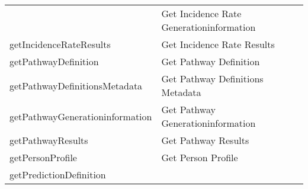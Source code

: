 \documentclass[
]{article}
\begin{document}
\begin{longtable}[]{@{}ll@{}}
\begin{minipage}[t]{0.46\columnwidth}
\end{minipage} & \begin{minipage}[t]{0.48\columnwidth}\raggedright
Get Incidence Rate Generationinformation\strut
\end{minipage}\tabularnewline
\begin{minipage}[t]{0.46\columnwidth}\raggedright
getIncidenceRateResults\strut
\end{minipage} & \begin{minipage}[t]{0.48\columnwidth}\raggedright
Get Incidence Rate Results\strut
\end{minipage}\tabularnewline
\begin{minipage}[t]{0.46\columnwidth}\raggedright
getPathwayDefinition\strut
\end{minipage} & \begin{minipage}[t]{0.48\columnwidth}\raggedright
Get Pathway Definition\strut
\end{minipage}\tabularnewline
\begin{minipage}[t]{0.46\columnwidth}\raggedright
getPathwayDefinitionsMetadata\strut
\end{minipage} & \begin{minipage}[t]{0.48\columnwidth}\raggedright
Get Pathway Definitions Metadata\strut
\end{minipage}\tabularnewline
\begin{minipage}[t]{0.46\columnwidth}\raggedright
getPathwayGenerationinformation\strut
\end{minipage} & \begin{minipage}[t]{0.48\columnwidth}\raggedright
Get Pathway Generationinformation\strut
\end{minipage}\tabularnewline
\begin{minipage}[t]{0.46\columnwidth}\raggedright
getPathwayResults\strut
\end{minipage} & \begin{minipage}[t]{0.48\columnwidth}\raggedright
Get Pathway Results\strut
\end{minipage}\tabularnewline
\begin{minipage}[t]{0.46\columnwidth}\raggedright
getPersonProfile\strut
\end{minipage} & \begin{minipage}[t]{0.48\columnwidth}\raggedright
Get Person Profile\strut
\end{minipage}\tabularnewline
\begin{minipage}[t]{0.46\columnwidth}\raggedright
getPredictionDefinition\strut
\end{minipage} & \begin{minipage}[t]{0.48\columnwidth}\raggedright

\end{minipage}
\end{longtable}
\end{document}
